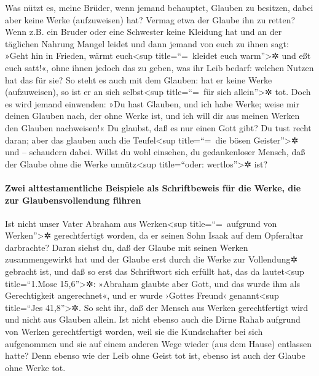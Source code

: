  Was nützt es, meine Brüder, wenn jemand behauptet,
Glauben zu besitzen, dabei aber keine Werke (aufzuweisen) hat? Vermag
etwa der Glaube ihn zu retten?  Wenn z.B. ein Bruder oder
eine Schwester keine Kleidung hat und an der täglichen Nahrung Mangel
leidet  und dann jemand von euch zu ihnen sagt: »Geht hin
in Frieden, wärmt euch\textless sup title=``=~kleidet euch
warm''\textgreater✲ und eßt euch satt!«, ohne ihnen jedoch das zu geben,
was ihr Leib bedarf: welchen Nutzen hat das für sie?  So
steht es auch mit dem Glauben: hat er keine Werke (aufzuweisen), so ist
er an sich selbst\textless sup title=``=~für sich allein''\textgreater✲
tot.  Doch es wird jemand einwenden: »Du hast Glauben,
und ich habe Werke; weise mir deinen Glauben nach, der ohne Werke ist,
und ich will dir aus meinen Werken den Glauben nachweisen!«
 Du glaubst, daß es nur einen Gott gibt? Du tust recht
daran; aber das glauben auch die Teufel\textless sup title=``=~die bösen
Geister''\textgreater✲ und -- schaudern dabei.  Willst du
wohl einsehen, du gedankenloser Mensch, daß der Glaube ohne die Werke
unnütz\textless sup title=``oder: wertlos''\textgreater✲ ist?

\hypertarget{zwei-alttestamentliche-beispiele-als-schriftbeweis-fuxfcr-die-werke-die-zur-glaubensvollendung-fuxfchren}{%
\paragraph{Zwei alttestamentliche Beispiele als Schriftbeweis für die
Werke, die zur Glaubensvollendung
führen}\label{zwei-alttestamentliche-beispiele-als-schriftbeweis-fuxfcr-die-werke-die-zur-glaubensvollendung-fuxfchren}}

 Ist nicht unser Vater Abraham aus Werken\textless sup
title=``=~aufgrund von Werken''\textgreater✲ gerechtfertigt worden, da
er seinen Sohn Isaak auf dem Opferaltar darbrachte? 
Daran siehst du, daß der Glaube mit seinen Werken zusammengewirkt hat
und der Glaube erst durch die Werke zur Vollendung✲ gebracht ist,
 und daß so erst das Schriftwort sich erfüllt hat, das da
lautet\textless sup title=``1.Mose 15,6''\textgreater✲: »Abraham glaubte
aber Gott, und das wurde ihm als Gerechtigkeit angerechnet«, und er
wurde ›Gottes Freund‹ genannt\textless sup title=``Jes
41,8''\textgreater✲.  So seht ihr, daß der Mensch aus
Werken gerechtfertigt wird und nicht aus Glauben allein. 
Ist nicht ebenso auch die Dirne Rahab aufgrund von Werken gerechtfertigt
worden, weil sie die Kundschafter bei sich aufgenommen und sie auf einem
anderen Wege wieder (aus dem Hause) entlassen hatte? 
Denn ebenso wie der Leib ohne Geist tot ist, ebenso ist auch der Glaube
ohne Werke tot.

